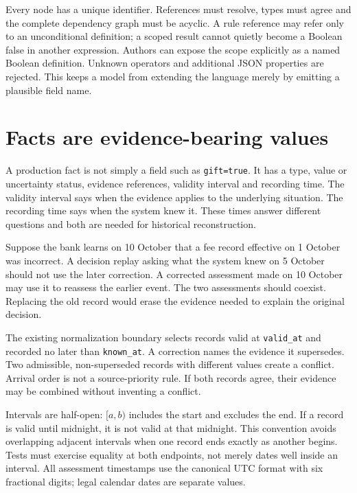 \documentclass[12pt,a4paper,oneside,openany]{book}
\begin{document}
Every node has a unique identifier. References must resolve, types must agree
and the complete dependency graph must be acyclic. A rule reference may refer
only to an unconditional definition; a scoped result cannot quietly become a
Boolean false in another expression. Authors can expose the scope explicitly
as a named Boolean definition. Unknown operators and additional JSON properties
are rejected. This keeps a model from extending the language merely by emitting
a plausible field name.

\section{Facts are evidence-bearing values}
\label{merge:M07:01}


A production fact is not simply a field such as \texttt{gift=true}. It has a type,
value or uncertainty status, evidence references, validity interval and recording
time. The validity interval says when the evidence applies to the underlying
situation. The recording time says when the system knew it. These times answer
different questions and both are needed for historical reconstruction.

Suppose the bank learns on 10 October that a fee record effective on 1 October
was incorrect. A decision replay asking what the system knew on 5 October should
not use the later correction. A corrected assessment made on 10 October may use
it to reassess the earlier event. The two assessments should coexist. Replacing
the old record would erase the evidence needed to explain the original decision.

The existing normalization boundary selects records valid at \texttt{valid\_at}
and recorded no later than \texttt{known\_at}. A correction names the evidence it
supersedes. Two admissible, non-superseded records with different values create a
conflict. Arrival order is not a source-priority rule. If both records agree,
their evidence may be combined without inventing a conflict.

Intervals are half-open: $[a,b)$ includes the start and excludes the end. If a
record is valid until midnight, it is not valid at that midnight. This convention
avoids overlapping adjacent intervals when one record ends exactly as another
begins. Tests must exercise equality at both endpoints, not merely dates well
inside an interval. All assessment timestamps use the canonical UTC format with
six fractional digits; legal calendar dates are separate values.
\end{document}
